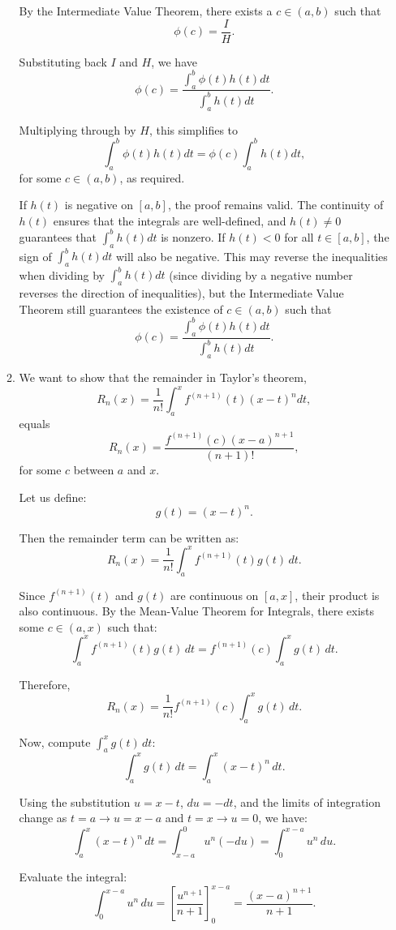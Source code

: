 \documentclass[12pt]{article}
\begin{document}
\begin{enumerate}
\begin{enumerate}
By the Intermediate Value Theorem, there exists a $c \in (a, b)$ such that
\[
\phi(c) = \frac{I}{H}.
\]

Substituting back $I$ and $H$, we have
\[
\phi(c) = \frac{\int_a^b \phi(t)h(t)dt}{\int_a^b h(t)dt}.
\]

Multiplying through by $H$, this simplifies to
\[
\int_a^b \phi(t)h(t)dt = \phi(c)\int_a^b h(t)dt,
\]
for some $c \in (a, b)$, as required.

If $h(t)$ is negative on $[a, b]$, the proof remains valid. The continuity of $h(t)$ ensures that the integrals are well-defined, and $h(t) \neq 0$ guarantees that $\int_a^b h(t)dt$ is nonzero. If $h(t) < 0$ for all $t \in [a, b]$, the sign of $\int_a^b h(t)dt$ will also be negative. This may reverse the inequalities when dividing by $\int_a^b h(t)dt$ (since dividing by a negative number reverses the direction of inequalities), but the Intermediate Value Theorem still guarantees the existence of $c \in (a, b)$ such that
\[
\phi(c) = \frac{\int_a^b \phi(t)h(t)dt}{\int_a^b h(t)dt}.
\]

\item 
We want to show that the remainder in Taylor's theorem,
\[
R_n(x) = \frac{1}{n!} \int_a^x f^{(n+1)}(t)(x - t)^n dt,
\]
equals
\[
R_n(x) = \frac{f^{(n+1)}(c)(x - a)^{n+1}}{(n+1)!},
\]
for some $c$ between $a$ and $x$.

Let us define:
\[
g(t) = (x - t)^n.
\]

Then the remainder term can be written as:
\[
R_n(x) = \frac{1}{n!} \int_a^x f^{(n+1)}(t) g(t) \, dt.
\]

Since $f^{(n+1)}(t)$ and $g(t)$ are continuous on $[a, x]$, their product is also continuous. By the Mean-Value Theorem for Integrals, there exists some $c \in (a, x)$ such that:
\[
\int_a^x f^{(n+1)}(t) g(t) \, dt = f^{(n+1)}(c) \int_a^x g(t) \, dt.
\]

Therefore,
\[
R_n(x) = \frac{1}{n!} f^{(n+1)}(c) \int_a^x g(t) \, dt.
\]

Now, compute $\int_a^x g(t) \, dt$:
\[
\int_a^x g(t) \, dt = \int_a^x (x - t)^n \, dt.
\]

Using the substitution $u = x - t$, $du = -dt$, and the limits of integration change as $t = a \to u = x - a$ and $t = x \to u = 0$, we have:
\[
\int_a^x (x - t)^n \, dt = \int_{x-a}^0 u^n (-du) = \int_0^{x-a} u^n \, du.
\]

Evaluate the integral:
\[
\int_0^{x-a} u^n \, du = \left[ \frac{u^{n+1}}{n+1} \right]_0^{x-a} = \frac{(x-a)^{n+1}}{n+1}.
\]


\end{enumerate}
\end{enumerate}
\end{document}

